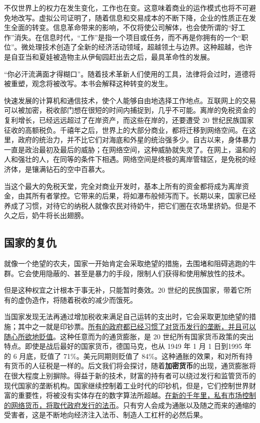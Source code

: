 不仅世界上的权力在发生变化，工作也在变。这意味着商业的运作模式也将不可避免地改写。虚拟公司证明了，随着信息和交易成本的不断下降，企业的性质正在发生全面的转变。信息革命带来的影响，不仅将使公司解体，也会使所谓的“好工作”消失。在信息时代，“工作”是指一个项目或任务，而不再是你拥有的一个“职位”。微处理技术创造了全新的经济活动领域，超越领土与边界。这种超越，也许是自亚当和夏娃被造物主从伊甸园赶出去之后，最具革命性的发展。


“你必汗流满面才得糊口”。随着技术革新人们使用的工具，法律将会过时，道德将被重塑，观念将被改写。本书会解释这种转变的发生。


快速发展的计算机和通信技术，使个人能够自由地选择工作地点。互联网上的交易可以被加密，税收部门想在很短的时间内捕捉到，几乎不可能。离岸的免税资金的复利增长，已经远远超过了在岸资产，而这些在岸的，还要遭受 20 世纪民族国家征收的高额税负。千禧年之后，世界上的大部分商业，都将迁移到网络空间。在这里，政府的统治力，并不比它们对海底和外星的统治强多少。自古以来，身体暴力一直是政治最初及最后的威胁；在网络空间，这种威胁就失灵了。在网上，温和的人和强壮的人，在同等的条件下相遇。网络空间是终极的离岸管辖区，是免税的经济体，是镶满钻石的空中百慕大。


当这个最大的免税天堂，完全对商业开发时，基本上所有的资金都将成为离岸资金，由其所有者掌控。它带来的后果，将如瀑布般倾泻而下。长期以来，国家已经养成了习惯，对待它的纳税人就像农民对待奶牛，把它们圈在农场里挤奶。但是不久之后，奶牛将长出翅膀。



\subsection{国家的复仇}
就像一个绝望的农夫，国家一开始肯定会采取绝望的措施，去围堵和阻碍逃跑的牛群。它会使用隐蔽的、甚至是暴力的手段，限制人们获得和使用解放性的技术。


但是这种权宜之计根本于事无补，只能暂时奏效。20 世纪的民族国家，带着它所有的虚伪造作，将随着税收的减少而饿死。


当国家发现无法再通过增加税收来满足自己运转的支出时，它会采取更加绝望的措施；其中之一就是印钞票。\uline{所有的政府都已经习惯了对货币发行的垄断，并且可以随心所欲地贬值}。这种任意而为的通货膨胀，是 20 世纪所有国家货币政策的突出特点。即使是战后最好的国家货币，德国马克，也从 1949 年 1 月 1 日到1995 年的 6 月底，贬值了 71\%。美元同期则贬值了 84\%。这种通胀的效果，和对所有持有货币的人征税是一样的。后文我们将会探讨，随着\textbf{加密货币}的出现，通货膨胀将在很大程度上别摒除。得益于新的技术，财富的持有者可以绕过发行和监管货币的现代国家的垄断机构。国家继续控制着工业时代的印钞机，但是，它们控制世界财富的重要性，将被没有实体存在的数字算法所超越。\uline{在新的千年里，私有市场控制的网络货币，将取代政府发行的法币}。只有穷人会成为通胀以及随之而来的通缩的受害者，这是不断地向经济注入法币、制造人工杠杆的必然后果。

